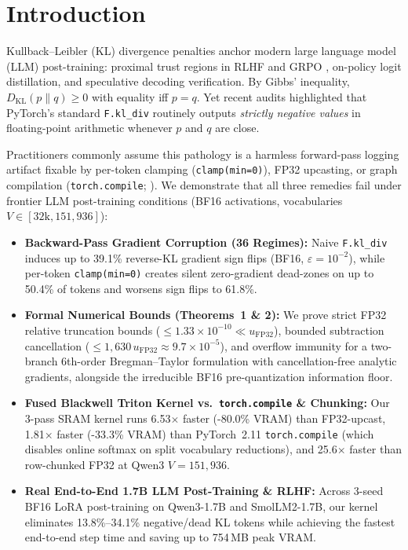 \documentclass[10pt,twocolumn]{article}
\newcommand{\KL}{D_{\mathrm{KL}}}
\begin{document}
\section{Introduction}
Kullback--Leibler (KL) divergence penalties anchor modern large language model (LLM) post-training: proximal trust regions in RLHF \citep{ouyang2022instructgpt} and GRPO \citep{shao2024deepseekmath}, on-policy logit distillation, and speculative decoding verification. By Gibbs' inequality, $\KL(p \parallel q) \ge 0$ with equality iff $p = q$. Yet recent audits \citep{klnegative2026} highlighted that PyTorch's standard \texttt{F.kl\_div} routinely outputs \emph{strictly negative values} in floating-point arithmetic whenever $p$ and $q$ are close.

Practitioners commonly assume this pathology is a harmless forward-pass logging artifact fixable by per-token clamping (\texttt{clamp(min=0)}), FP32 upcasting, or graph compilation (\texttt{torch.compile}; \citealt{ansel2024pytorch2}). We demonstrate that all three remedies fail under frontier LLM post-training conditions (BF16 activations, vocabularies $V \in [32\text{k}, 151{,}936]$):
\begin{itemize}
  \item \textbf{Backward-Pass Gradient Corruption (36 Regimes):} Naive \texttt{F.kl\_div} induces up to 39.1\% reverse-KL gradient sign flips (BF16, $\varepsilon=10^{-2}$), while per-token \texttt{clamp(min=0)} creates silent zero-gradient dead-zones on up to 50.4\% of tokens and worsens sign flips to 61.8\%.
  \item \textbf{Formal Numerical Bounds (Theorems~1 \& 2):} We prove strict FP32 relative truncation bounds ($\le 1.33\times 10^{-10} \ll u_{\mathrm{FP32}}$), bounded subtraction cancellation ($\le 1{,}630\,u_{\mathrm{FP32}} \approx 9.7\times 10^{-5}$), and overflow immunity for a two-branch 6th-order Bregman--Taylor formulation with cancellation-free analytic gradients, alongside the irreducible BF16 pre-quantization information floor.
  \item \textbf{Fused Blackwell Triton Kernel vs.\ \texttt{torch.compile} \& Chunking:} Our 3-pass SRAM kernel runs 6.53$\times$ faster (-80.0\% VRAM) than FP32-upcast, 1.81$\times$ faster (-33.3\% VRAM) than PyTorch~2.11 \texttt{torch.compile} (which disables online softmax on split vocabulary reductions), and 25.6$\times$ faster than row-chunked FP32 at Qwen3 $V=151{,}936$.
  \item \textbf{Real End-to-End 1.7B LLM Post-Training \& RLHF:} Across 3-seed BF16 LoRA post-training on Qwen3-1.7B and SmolLM2-1.7B, our kernel eliminates 13.8\%--34.1\% negative/dead KL tokens while achieving the fastest end-to-end step time and saving up to 754\,MB peak VRAM.
\end{itemize}
\end{document}
